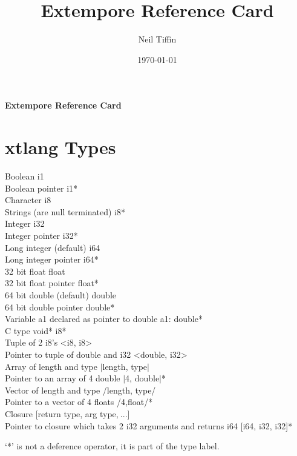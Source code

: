 \documentclass[10pt, twoside]{article}   	%
\title{Extempore Reference Card}
\author{Neil Tiffin}
\date{\today}				%
\begin{document}
\newcommand{\xtType}[1]{\texttt\scriptsize{\textcolor{xtLangTypecolor}{ #1}}\normalsize}
\newcommand{\xtFunc}[1]{\textcolor{xtLangColor}{#1}}
\newcommand{\schemeVerb}[1]{\textcolor{schemeVerbColor}{#1}}
\newcommand{\xtSchemeVerb}[1]{\textcolor{xtLangSchemeVerbColor}{#1}}
\begin{multicols}{3}

\begin{center}
     \Large{\textbf{Extempore Reference Card}}
\end{center}
\section*{xtlang Types}
\begin{spacing}{1.5}
Boolean							\hfill \xtType{i1} \\
Boolean pointer						\hfill \xtType{i1*} \\
Character							\hfill \xtType{i8} \\
Strings {\scriptsize(are null terminated)}	\hfill \xtType{i8*} \\
Integer							\hfill \xtType{i32} \\
Integer pointer						\hfill \xtType{i32*} \\
Long integer (default)				\hfill \xtType{i64} \\
Long integer pointer					\hfill \xtType{i64*} \\
32 bit float							\hfill \xtType{float} \\
32 bit float	 pointer					\hfill \xtType{float*} \\
64 bit double (default)				\hfill \xtType{double} \\
64 bit double pointer					\hfill \xtType{double*} \\
Variable a1 declared as pointer to double \hfill a1:\xtType{double*} \\
C type void*						\hfill \xtType{i8*} \\
Tuple of 2 i8's						\hfill \xtType{\textless  i8, i8\textgreater} \\
Pointer to tuple of double and i32		\null \hfill \xtType{\textless double, i32\textgreater *} \\
Array of length and type 				\hfill \xtType{$\vert$length, type$\vert$} \\
Pointer to an array of 4 double			\hfill \xtType{$\vert$4, double$\vert$*} \\
Vector of length and type				\hfill \xtType{/length, type/} \\
Pointer to a vector of 4 floats			\hfill \xtType{/4,float/*} \\
Closure							\hfill \xtType{[return type, arg type,$\:\mathit{. . .}$]}\\
Pointer to closure which takes 2 i32 arguments and returns i64\hfill \xtType{[i64, i32, i32]*} \\
\scriptsize
{\raggedright
`*' is not a deference operator, it is part of the type label.\par}
\normalsize
\vspace{-5mm}
\end{spacing}



\end{multicols}
\end{document}
